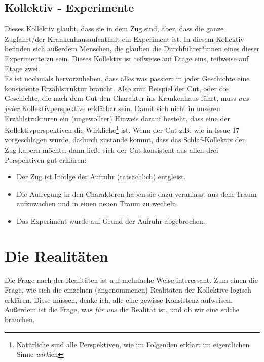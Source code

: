 \documentclass[12pt, a4paper, openany]{report}
\begin{document}
\subsection{Kollektiv - Experimente}
Dieses Kollektiv glaubt, dass sie in dem Zug sind, aber, dass die ganze Zugfahrt/der Krankenhausaufenthalt ein Experiment ist. 
In diesem Kollektiv befinden sich außerdem Menschen, die glauben die Durchführer*innen eines dieser Experimente zu sein.
Dieses Kollektiv ist teilweise auf Etage eins, teilweise auf Etage zwei.\\

Es ist nochmals hervorzuheben, dass alles was passiert in jeder Geschichte eine konsistente Erzählstruktur braucht. 
Also zum Beispiel der Cut, oder die Geschichte, die nach dem Cut den Charakter ins Krankenhaus führt, muss \emph{aus jeder} Kollektivperspektive erklärbar sein.
Damit sich nicht in unseren Erzählstrukturen ein (ungewollter) Hinweis darauf besteht, dass eine der Kollektivperspektiven die Wirkliche\footnote{Natürliche sind alle Perspektiven, wie \hyperref[realitaeten]{im Folgenden} erklärt im eigentlichen Sinne \emph{wirk}ich} ist.
Wenn der Cut z.B. wie in Issue 17 vorgeschlagen wurde, dadurch zustande kommt, dass das Schlaf-Kollektiv den Zug kapern möchte, dann ließe sich der Cut konsistent aus allen drei Perspektiven gut erklären:
\begin{itemize}
    \item[Kollektiv 1:] Der Zug ist Infolge der Aufruhr (tatsächlich) entgleist.
    \item[Kollektiv 2:] Die Aufregung in den Charakteren haben sie dazu
      veranlasst aus dem Traum aufzuwachen und in einen neuen Traum zu wecheln.
    \item[Kollektiv 3:] Das Experiment wurde auf Grund der Aufruhr abgebrochen.
\end{itemize}

\section{Die Realitäten}\label{realitaeten}
Die Frage nach der Realitäten ist auf mehrfache Weise interessant. 
Zum einen die Frage, wie sich die einzelnen (angenommenen) Realitäten der Kollektive logisch erklären. 
Diese müssen, denke ich, alle eine gewisse Konsistenz aufweisen.
Außerdem ist die Frage, was \emph{für uns} die Realität ist, und ob wir eine solche brauchen.\\
\end{document}
